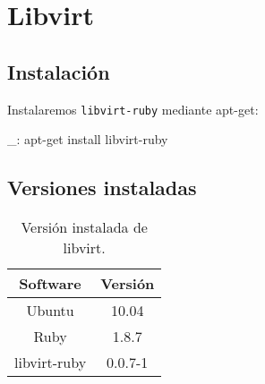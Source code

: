 \chapter{Libvirt}
\label{comun:libvirt}

\section{Instalación}

Instalaremos \texttt{libvirt-ruby} mediante apt-get:

\begin{bashcode}
_: apt-get install libvirt-ruby
\end{bashcode}


\section{Versiones instaladas}

\begin{table}[!htbp]
\centering
   \begin{tabular}{|c|c|}
      \hline
      \textbf{Software} & \textbf{Versión} \\ \hline
      Ubuntu & 10.04 \\ \hline
      Ruby & 1.8.7 \\ \hline
      libvirt-ruby & 0.0.7-1 \\ \hline
   \end{tabular}
\caption{Versión instalada de libvirt.}
\label{table:libvirt-versions}
\end{table}

